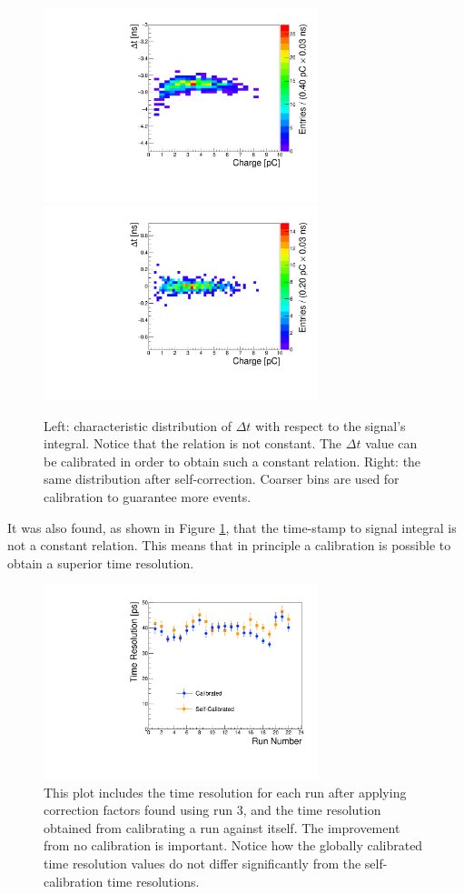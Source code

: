 \documentclass[twocolumn]{article}
\begin{document}
\begin{figure}[htbp]
	\centering
	\includegraphics[width=8cm]{Images/dt-int/dtint30_o22.pdf}
	\includegraphics[width=8cm]{Images/dt-int/dtint30_c22.pdf}
	\caption{\small Left: characteristic distribution of $\Delta t$ with respect to the signal's integral. Notice that the relation is not constant. The $\Delta t$ value can be calibrated in order to obtain such a constant relation. Right: the same distribution after self-correction. Coarser bins are used for calibration to guarantee more events.}
	\label{fig:dt-int}
\end{figure}

It was also found, as shown in Figure \ref{fig:dt-int}, that the time-stamp to signal integral is not a constant relation. This means that in principle a calibration is possible to obtain a superior time resolution.

\begin{figure}[htbp]
	\centering
	\includegraphics[width=8cm]{Images/calibtres/timerescalib.pdf}
	\caption{\small This plot includes the time resolution for each run after applying correction factors found using run 3, and the time resolution obtained from calibrating a run against itself. The improvement from no calibration is important. Notice how the globally calibrated time resolution values do not differ significantly from the self-calibration time resolutions.}
	\label{fig:calib}
\end{figure}
\end{document}
